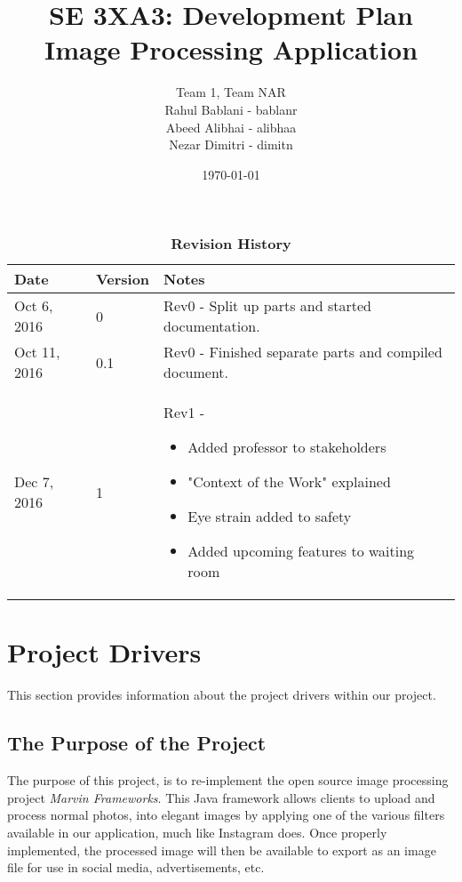 \documentclass[12pt, titlepage]{article}
\title{SE 3XA3: Development Plan\\Image Processing Application}
\author{Team 1, Team NAR
		\\ Rahul Bablani - bablanr
		\\ Abeed Alibhai - alibhaa
		\\ Nezar Dimitri - dimitn
}
\date{\today}
\begin{document}
\maketitle

\tableofcontents
\listoftables
\listoffigures

\begin{table}[htbp]
\caption{\bf Revision History}
\begin{tabularx}{\textwidth}{p{3cm}p{2cm}X}
\toprule {\bf Date} & {\bf Version} & {\bf Notes}\\
\midrule
Oct 6, 2016 & 0 & Rev0 - Split up parts and started documentation.\\
Oct 11, 2016 & 0.1 & Rev0 - Finished separate parts and compiled document.\\
Dec 7, 2016 & 1 & Rev1 - 
\begin{itemize}
	\item Added professor to stakeholders
	\item "Context of the Work" explained
	\item Eye strain added to safety
	\item Added upcoming features to waiting room
\end{itemize}


\end{tabularx}
\end{table}

\clearpage


\section{Project Drivers}

This section provides information about the project drivers within our project.

\subsection{The Purpose of the Project}

The purpose of this project, is to re-implement the open source image processing project \textit{Marvin Frameworks}. This Java framework allows clients to upload and process normal photos, into elegant images by applying one of the various filters available in our application, much like Instagram does. Once properly implemented, the processed image will then be available to export as an image file for use in social media, advertisements, etc.
\end{document}
